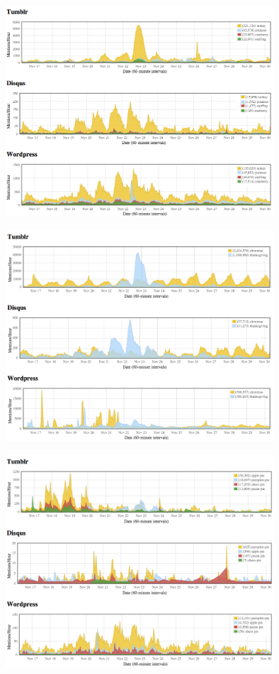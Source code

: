 \documentclass{beamer}
\begin{document}
\begin{frame}
  \begin{center}
    \includegraphics[width=10cm]{./imgs/t-day2012.png}
  \end{center}
\end{frame}

\begin{frame}
  \begin{center}
    \includegraphics[width=10cm]{./imgs/t-dayvsx-mas.png}
  \end{center}
\end{frame}

\begin{frame}
  \begin{center}
    \includegraphics[width=10cm]{./imgs/pies2012.png}
  \end{center}
\end{frame}
\end{document}
